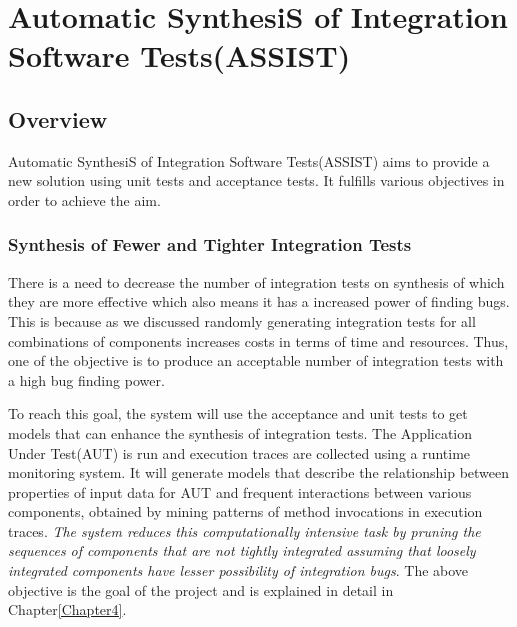 
\chapter{Automatic SynthesiS of Integration Software Tests(ASSIST)} %

\label{Chapter2} %



\section{Overview}
Automatic SynthesiS of Integration Software Tests(ASSIST) aims to provide a new solution using unit tests and acceptance tests. It fulfills various objectives in order to achieve the aim.

\subsection{Synthesis of Fewer and Tighter Integration Tests}
There is a need to decrease the number of integration tests on synthesis of which they are more effective which also means it has a increased power of finding bugs. This is because as we discussed randomly generating integration tests for all combinations of components increases costs in terms of time and resources. Thus, one of the objective is to produce an acceptable number of integration tests with a high bug finding power.

To reach this goal, the system will use the acceptance and unit tests to get models that can enhance the synthesis of integration tests. The Application Under Test(AUT) is run and execution traces are collected using a runtime monitoring system. It will generate models that describe the relationship between properties of input data for AUT and frequent interactions between various components, obtained by mining patterns of method invocations in execution traces. \emph{The system reduces this computationally intensive task by pruning the sequences of components that are not tightly integrated assuming that loosely integrated components have lesser possibility of integration bugs}. The above objective is the goal of the project and is explained in detail in Chapter\ref{Chapter4}.
 
